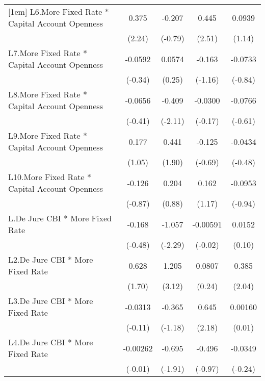 {\begin{longtable}{l*{4}{c}}
[1em]
L6.More Fixed Rate * Capital Account Openness&    0.375\sym{*}  &   -0.207         &    0.445\sym{*}  &   0.0939         \\
                &   (2.24)         &  (-0.79)         &   (2.51)         &   (1.14)         \\
[1em]
L7.More Fixed Rate * Capital Account Openness&  -0.0592         &   0.0574         &   -0.163         &  -0.0733         \\
                &  (-0.34)         &   (0.25)         &  (-1.16)         &  (-0.84)         \\
[1em]
L8.More Fixed Rate * Capital Account Openness&  -0.0656         &   -0.409\sym{*}  &  -0.0300         &  -0.0766         \\
                &  (-0.41)         &  (-2.11)         &  (-0.17)         &  (-0.61)         \\
[1em]
L9.More Fixed Rate * Capital Account Openness&    0.177         &    0.441         &   -0.125         &  -0.0434         \\
                &   (1.05)         &   (1.90)         &  (-0.69)         &  (-0.48)         \\
[1em]
L10.More Fixed Rate * Capital Account Openness&   -0.126         &    0.204         &    0.162         &  -0.0953         \\
                &  (-0.87)         &   (0.88)         &   (1.17)         &  (-0.94)         \\
[1em]
L.De Jure CBI * More Fixed Rate&   -0.168         &   -1.057\sym{*}  & -0.00591         &   0.0152         \\
                &  (-0.48)         &  (-2.29)         &  (-0.02)         &   (0.10)         \\
[1em]
L2.De Jure CBI * More Fixed Rate&    0.628         &    1.205\sym{**} &   0.0807         &    0.385\sym{*}  \\
                &   (1.70)         &   (3.12)         &   (0.24)         &   (2.04)         \\
[1em]
L3.De Jure CBI * More Fixed Rate&  -0.0313         &   -0.365         &    0.645\sym{*}  &  0.00160         \\
                &  (-0.11)         &  (-1.18)         &   (2.18)         &   (0.01)         \\
[1em]
L4.De Jure CBI * More Fixed Rate& -0.00262         &   -0.695         &   -0.496         &  -0.0349         \\
                &  (-0.01)         &  (-1.91)         &  (-0.97)         &  (-0.24)         \\

\end{longtable}}
